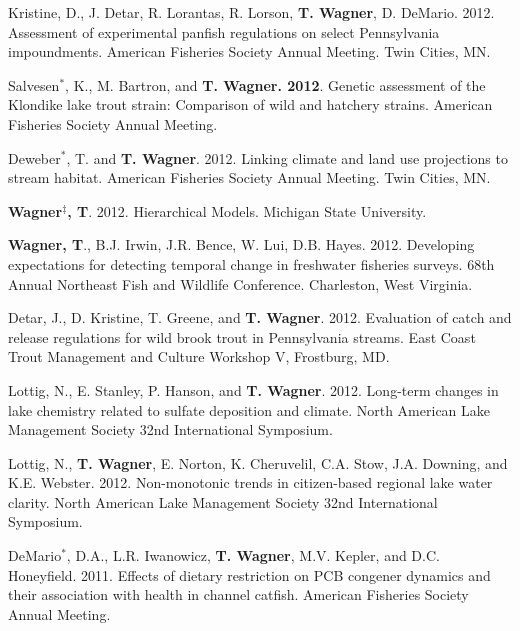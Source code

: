 \documentclass[10pt]{article}
\begin{document}
\begin{flushleft}
\begin{etaremune}
\item Kristine, D., J. Detar, R. Lorantas, R. Lorson,  {\bf T. Wagner}, D. DeMario. 2012. Assessment of experimental panfish regulations on select Pennsylvania impoundments. American Fisheries Society Annual Meeting. Twin Cities, MN.

\item Salvesen$^*$, K., M. Bartron, and {\bf T. Wagner. 2012}. Genetic assessment of the Klondike lake trout strain: Comparison of wild and hatchery strains. American Fisheries Society Annual Meeting. 

\item Deweber$^*$, T. and  {\bf T. Wagner}. 2012. Linking climate and land use projections to stream habitat. American Fisheries Society Annual Meeting. Twin Cities, MN. 

\item {\bf Wagner$^\ddagger$, T}. 2012. Hierarchical Models. Michigan State University.

 \item {\bf Wagner, T}., B.J. Irwin, J.R. Bence, W. Lui, D.B. Hayes. 2012. Developing expectations for detecting temporal change in freshwater fisheries surveys. 68th Annual Northeast Fish and Wildlife Conference. Charleston, West Virginia. 

\item Detar, J., D. Kristine, T. Greene, and {\bf T. Wagner}. 2012. Evaluation of catch and release regulations for wild brook trout in Pennsylvania streams. East Coast Trout Management and Culture Workshop V, Frostburg, MD.

\item Lottig, N., E. Stanley, P. Hanson, and {\bf T. Wagner}. 2012. Long-term changes in lake chemistry related to sulfate deposition and climate. North American Lake Management Society 32nd International Symposium.

\item Lottig, N., {\bf T. Wagner}, E. Norton, K. Cheruvelil, C.A. Stow, J.A. Downing, and K.E. Webster. 2012. Non-monotonic trends in citizen-based regional lake water clarity. North American Lake Management Society 32nd International Symposium.


\item DeMario$^*$, D.A., L.R. Iwanowicz, {\bf T. Wagner}, M.V. Kepler, and D.C. Honeyfield. 2011. Effects of dietary restriction on PCB congener dynamics and their association with health in channel catfish. American Fisheries Society Annual Meeting. 


\end{etaremune}
\end{flushleft}
\end{document}
